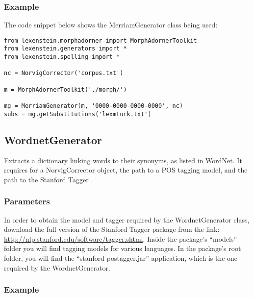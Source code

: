\subsubsection{Example}

The code snippet below shows the MerriamGenerator class being used:

\begin{lstlisting}
from lexenstein.morphadorner import MorphAdornerToolkit
from lexenstein.generators import *
from lexenstein.spelling import *

nc = NorvigCorrector('corpus.txt')

m = MorphAdornerToolkit('./morph/')

mg = MerriamGenerator(m, '0000-0000-0000-0000', nc)
subs = mg.getSubstitutions('lexmturk.txt')
\end{lstlisting}















\subsection{WordnetGenerator}

Extracts a dictionary linking words to their synonyms, as listed in WordNet. It requires for a NorvigCorrector object, the path to a POS tagging model, and the path to the Stanford Tagger \cite{Klein1965}.

\subsubsection{Parameters}

In order to obtain the model and tagger required by the WordnetGenerator class, download the full version of the Stanford Tagger package from the link: \url{http://nlp.stanford.edu/software/tagger.shtml}. Inside the package's ``models'' folder you will find tagging models for various languages. In the package's root folder, you will find the ``stanford-postagger.jar'' application, which is the one required by the WordnetGenerator.

\subsubsection{Example}

